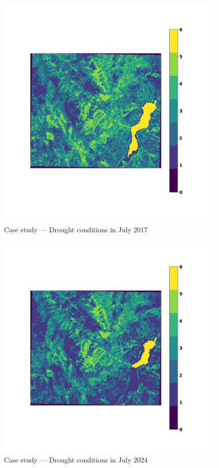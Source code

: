 \documentclass[10pt,twocolumn]{article}
\begin{document}
\begin{figure}[h]
  \centering

  \begin{minipage}{1\columnwidth}
      \centering
      \includegraphics[width=\textwidth]{images/results/july/case/Riserva naturale Pizzo Cane, Pizzo Trigna, Grotta Mazzamuto_K=6+1_2017_july.png}
      \caption{Case study — Drought conditions in July 2017}
      \label{fig:case_july_lr_2017}
  \end{minipage}
  \hfill
  \begin{minipage}{1\columnwidth}
      \centering
      \includegraphics[width=\textwidth]{images/results/july/case/Riserva naturale Pizzo Cane, Pizzo Trigna, Grotta Mazzamuto_K=6+1_2024_july.png}
      \caption{Case study — Drought conditions in July 2024}
      \label{fig:case_july_lr_2024}
  \end{minipage}

\end{figure}
\end{document}
